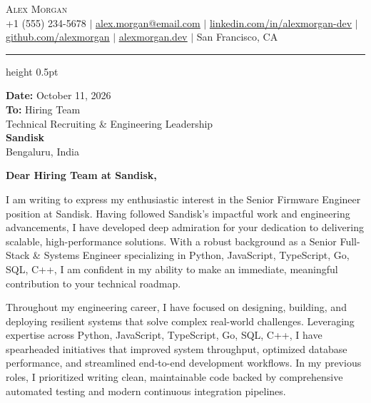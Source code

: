 \documentclass[letterpaper,11pt]{article}
\begin{document}
\begin{center}
    {\Huge \scshape Alex Morgan} \\ \vspace{4pt}
    \small +1 (555) 234-5678 $|$ \href{mailto:alex.morgan@email.com}{\underline{alex.morgan@email.com}} $|$ 
    \href{https://linkedin.com/in/alexmorgan-dev}{\underline{linkedin.com/in/alexmorgan-dev}} $|$
    \href{https://github.com/alexmorgan}{\underline{github.com/alexmorgan}} $|$ \href{https://alexmorgan.dev}{\underline{alexmorgan.dev}} $|$
    San Francisco, CA
\end{center}

\vspace{10pt}
\hrule height 0.5pt
\vspace{14pt}

\begin{flushleft}
    \textbf{Date:} October 11, 2026 \\ \vspace{8pt}
    \textbf{To:} Hiring Team \\
    Technical Recruiting \& Engineering Leadership \\
    \textbf{Sandisk} \\
    Bengaluru, India
\end{flushleft}

\vspace{14pt}

\textbf{Dear Hiring Team at Sandisk,}\par

\vspace{8pt}

I am writing to express my enthusiastic interest in the Senior Firmware Engineer position at Sandisk. Having followed Sandisk's impactful work and engineering advancements, I have developed deep admiration for your dedication to delivering scalable, high-performance solutions. With a robust background as a Senior Full-Stack \& Systems Engineer specializing in Python, JavaScript, TypeScript, Go, SQL, C++, I am confident in my ability to make an immediate, meaningful contribution to your technical roadmap.\par

\vspace{10pt}

Throughout my engineering career, I have focused on designing, building, and deploying resilient systems that solve complex real-world challenges. Leveraging expertise across Python, JavaScript, TypeScript, Go, SQL, C++, I have spearheaded initiatives that improved system throughput, optimized database performance, and streamlined end-to-end development workflows. In my previous roles, I prioritized writing clean, maintainable code backed by comprehensive automated testing and modern continuous integration pipelines.\par
\end{document}
